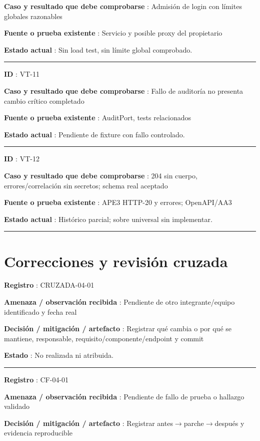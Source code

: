 \documentclass[12pt,a4paper]{report}
\begin{document}
\textbf{Caso y resultado que debe comprobarse }: Admisión de login con
límites globales razonables

\textbf{Fuente o prueba existente }: Servicio y posible proxy del
propietario

\textbf{Estado actual }: Sin load test, sin límite global comprobado.

\medskip\hrule\medskip

\textbf{ID }: VT-11

\textbf{Caso y resultado que debe comprobarse }: Fallo de auditoría no
presenta cambio crítico completado

\textbf{Fuente o prueba existente }: AuditPort, tests relacionados

\textbf{Estado actual }: Pendiente de fixture con fallo controlado.

\medskip\hrule\medskip

\textbf{ID }: VT-12

\textbf{Caso y resultado que debe comprobarse }: 204 sin cuerpo,
errores/correlación sin secretos; schema real aceptado

\textbf{Fuente o prueba existente }: APE3 HTTP-20 y errores; OpenAPI/AA3

\textbf{Estado actual }: Histórico parcial; sobre universal sin
implementar.

\medskip\hrule\medskip

\section{Correcciones y revisión
cruzada}\label{ACD4-semana-4-anexo1-correcciones-y-revisiuxf3n-cruzada}

\textbf{Registro }: CRUZADA-04-01

\textbf{Amenaza / observación recibida }: Pendiente de otro
integrante/equipo identificado y fecha real

\textbf{Decisión / mitigación / artefacto }: Registrar qué cambia o por
qué se mantiene, responsable, requisito/componente/endpoint y commit

\textbf{Estado }: No realizada ni atribuida.

\medskip\hrule\medskip

\textbf{Registro }: CF-04-01

\textbf{Amenaza / observación recibida }: Pendiente de fallo de prueba o
hallazgo validado

\textbf{Decisión / mitigación / artefacto }: Registrar
antes\ensuremath{\rightarrow}parche\ensuremath{\rightarrow}después y evidencia reproducible
\end{document}
